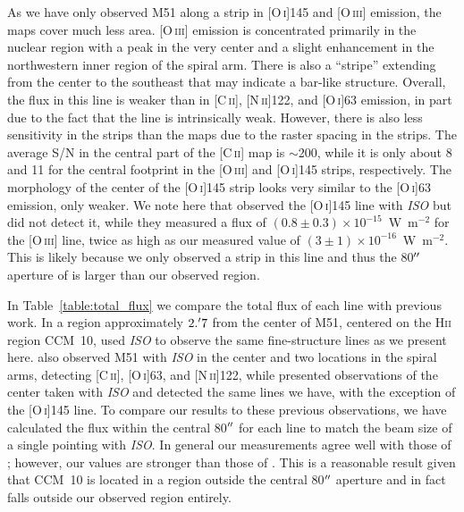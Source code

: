 As we have only observed M51 along a strip in [O\,\textsc{i}]145 and [O\,\textsc{iii}] emission, the maps cover much less area.  [O\,\textsc{iii}] emission is concentrated primarily in the nuclear region with a peak in the very center and a slight enhancement in the northwestern inner region of the spiral arm.  There is also a ``stripe'' extending from the center to the southeast that may indicate a bar-like structure.  Overall, the flux in this line is weaker than in [C\,\textsc{ii}], [N\,\textsc{ii}]122, and [O\,\textsc{i}]63 emission, in part due to the fact that the line is intrinsically weak.  However, there is also less sensitivity in the strips than the maps due to the raster spacing in the strips.  The average S/N in the central part of the [C\,\textsc{ii}] map is $\sim$200, while it is only about 8 and 11 for the central footprint in the [O\,\textsc{iii}] and [O\,\textsc{i}]145 strips, respectively.  The morphology of the center of the [O\,\textsc{i}]145 strip looks very similar to the [O\,\textsc{i}]63 emission, only weaker.  We note here that \citet{2001A&A...375..566N} observed the [O\,\textsc{i}]145 line with \emph{ISO} but did not detect it, while they measured a flux of $(0.8 \pm 0.3) \times 10^{-15}$~W~m$^{-2}$ for the [O\,\textsc{iii}] line, twice as high as our measured value of $(3 \pm 1) \times 10^{-16}$~W~m$^{-2}$.  This is likely because we only observed a strip in this line and thus the 80$\mbox{$^{\prime\prime}$}$ aperture of \citet{2001A&A...375..566N} is larger than our observed region.

In Table~\ref{table:total_flux} we compare the total flux of each line with previous work.  In a region approximately $2.\mbox{$^\prime$}7$ from the center of M51, centered on the H\textsc{ii} region CCM~10, \citet{2004AJ....128.2772G} used \emph{ISO} to observe the same fine-structure lines as we present here.  \citet{2005A&A...441..961K} also observed M51 with \emph{ISO} in the center and two locations in the spiral arms, detecting [C\,\textsc{ii}], [O\,\textsc{i}]63, and [N\,\textsc{ii}]122, while \citet{2001A&A...375..566N} presented observations of the center taken with \emph{ISO} and detected the same lines we have, with the exception of the [O\,\textsc{i}]145 line.  To compare our results to these previous observations, we have calculated the flux within the central 80$\mbox{$^{\prime\prime}$}$ for each line to match the beam size of a single pointing with \emph{ISO}.  In general our measurements agree well with those of \citet{2001A&A...375..566N}; however, our values are stronger than those of \citet{2004AJ....128.2772G}.  This is a reasonable result given that CCM~10 is located in a region outside the central 80$\mbox{$^{\prime\prime}$}$ aperture and in fact falls outside our observed region entirely.

